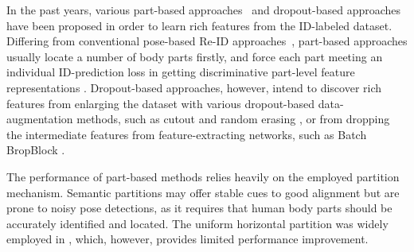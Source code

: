\documentclass[journal]{IEEEtran}
\begin{document}
In the past years, various part-based approaches~\cite{yao2017deep,sun2018beyond,zhao2017deeply} and dropout-based approaches~\cite{dai2018batch} have been proposed in order to learn rich features from the ID-labeled dataset. Differing from conventional pose-based Re-ID approaches~\cite{su2017pose,kumar2017pose,zheng2017pose,qian2018pose}, part-based approaches usually locate a number of body parts firstly, and force each part meeting an individual ID-prediction loss in getting discriminative part-level feature representations \cite{wang2018MGN,suh2018part,cheng2016person,fan2018scpnet}.
Dropout-based approaches, however, intend to discover rich features from enlarging the dataset with various dropout-based data-augmentation methods, such as cutout \cite{DeVries2017Cut} and random erasing \cite{zhong2017Erasing}, or from dropping the intermediate features from feature-extracting networks, such as Batch BropBlock \cite{dai2019BDB}.

The performance of part-based methods relies heavily on the employed partition mechanism. Semantic partitions may offer stable cues to good alignment but are prone to noisy pose detections, as it requires that human body parts should be accurately identified and located.  The uniform horizontal partition was widely employed in \cite{sun2018beyond,suh2018part}, which, however, provides limited performance improvement.
\end{document}
